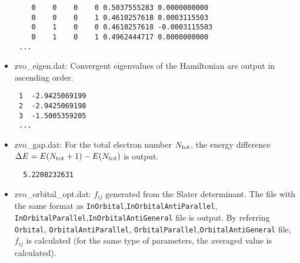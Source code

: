 \begin{itemize}
\begin{minipage}{13cm}
\begin{screen}
\begin{verbatim}
    0    0    0    0 0.5037555283 0.0000000000
    0    0    0    1 0.4610257618 0.0003115503
    0    1    0    0 0.4610257618 -0.0003115503
    0    1    0    1 0.4962444717 0.0000000000
 ...
\end{verbatim}
\end{screen}
\end{minipage}    
    
\item{zvo\_eigen.dat:} Convergent eigenvalues of the Hamiltonian are output in ascending order. \\
\begin{minipage}{13cm}
\begin{screen}
\begin{verbatim}
 1  -2.9425069199
 2  -2.9425069198
 3  -1.5005359205 
 ...
\end{verbatim}
\end{screen}
\end{minipage}

\item{zvo\_gap.dat:} For the total electron number $N_{\rm tot}$, the energy difference $\Delta E= E(N_{\rm tot}+1)-E(N_{\rm tot})$ is output.

\begin{minipage}{13cm}
\begin{screen}
\begin{verbatim}
  5.2208232631
\end{verbatim}
\end{screen}
\end{minipage}

\item{zvo\_orbital\_opt.dat:} $f_{ij}$ generated from the Slater determinant. The file with the same format as \verb|InOrbital|,\verb|InOrbitalAntiParallel|, \verb|InOrbitalParallel|,\verb|InOrbitalAntiGeneral| file is output.
By referring \verb|Orbital|, \verb|OrbitalAntiParallel|, \verb|OrbitalParallel|,\verb|OrbitalAntiGeneral| file, $f_{ij}$ is calculated (for the same type of parameters, the averaged value is calculated).

\end{itemize}




